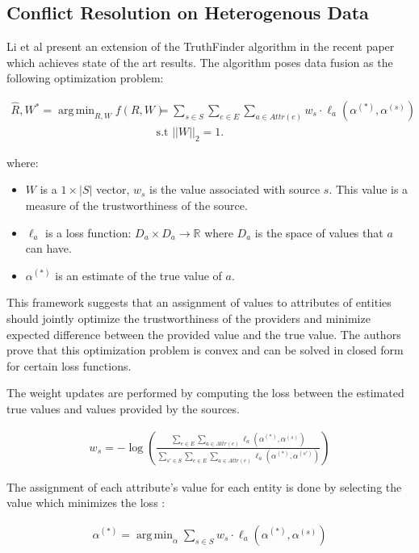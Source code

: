 \documentclass{acm_proc_article-sp}
\DeclareMathOperator*{\argmin}{arg\,min}
\begin{document}
\subsection{Conflict Resolution on Heterogenous Data}

Li et al present an extension of the {\sc TruthFinder} algorithm in the recent paper \cite{li:resolving} which achieves state of the art results. The algorithm poses data fusion as the following optimization problem: 

\begin{align}
\hat{R}, W^* = \argmin_{R,W} f(R, W) & = \sum_{s \in S} \sum_{e \in E} \sum_{a \in Attr(e)} w_s \cdot \ell_a(\alpha^{(*)}, \alpha^{(s)}) \\
& \text{s.t } ||W||_2 =1. \nonumber 
\end{align}

where: 

\begin{itemize}
\item $W$ is a $1\times|S|$ vector, $w_s$ is the value associated with source $s$. This value is a measure of the trustworthiness of the source. 
\item $\ell_a$ is a loss function: $D_a \times D_a \rightarrow \mathbb{R}$ where $D_a$ is the space of values that $a$ can have. 
\item $\alpha^{(*)}$ is an estimate of the true value of $a$. 
\end{itemize}

This framework suggests that an assignment of values to attributes of entities should jointly optimize the trustworthiness of the providers and minimize expected difference between the provided value and the true value. The authors prove that this optimization problem is convex and can be solved in closed form for certain loss functions. 

The weight updates are performed by computing the loss between the estimated true values and values provided by the sources. 

\begin{align}
w_s = - \log \left ( \frac{\sum_{e \in E} \sum_{a \in Attr(e)} \ell_a(\alpha^{(*)}, \alpha^{(s)})}{\sum_{s' \in S} \sum_{e \in E}  \sum_{a \in Attr(e)} \ell_a(\alpha^{(*)}, \alpha^{(s')})} \right )
\end{align}

The assignment of each attribute's value for each entity is done by selecting the value which minimizes the loss : 

\begin{align}
\alpha^{(*)} = \argmin_\alpha \sum_{s \in S} w_s \cdot \ell_a(\alpha^{(*)}, \alpha^{(s)})
\end{align}
\end{document}
